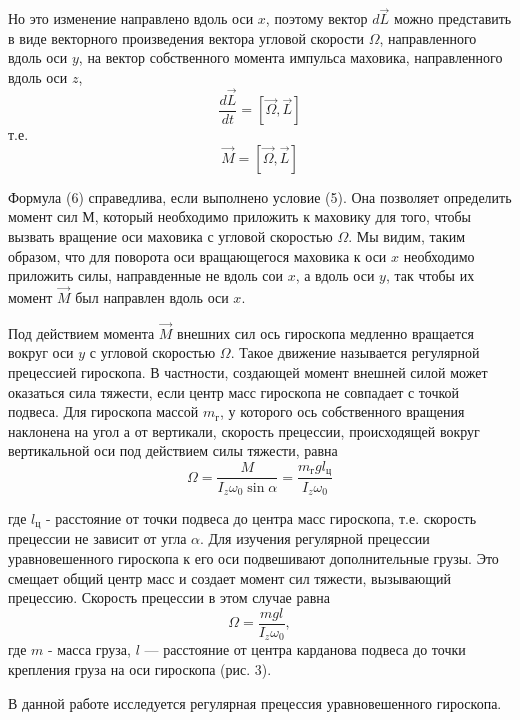Но это изменение направлено вдоль оси $x$, поэтому вектор $d\vec{L}$
можно представить в виде векторного произведения вектора угловой
скорости $\Omega$, направленного вдоль оси $y$, на вектор
собственного момента импульса маховика, направленного вдоль оси $z$,
\begin{equation*}
    \frac{d\vec{L}}{dt} = \left[\vec \Omega, \vec L\right]
\end{equation*}
т.е.
\begin{equation}
    \vec{M} = \left[\vec \Omega, \vec L\right]
\end{equation}

Формула (6) справедлива, если выполнено условие (5). Она позволяет
определить момент сил М, который необходимо приложить к маховику
для того, чтобы вызвать вращение оси маховика с угловой скоростью
$\Omega$. Мы видим, таким образом, что для поворота оси
вращающегося маховика к оси $x$ необходимо приложить силы, направденные
не вдоль сои $x$, а вдоль оси $y$, так чтобы их момент $\vec{M}$
был направлен вдоль оси $x$.


Под действием момента $\vec{M}$ внешних сил ось гироскопа медленно
вращается вокруг оси $y$ с угловой скоростью $\Omega$. Такое
движение называется регулярной прецессией гироскопа. В частности,
создающей момент внешней силой может оказаться сила тяжести, если
центр масс гироскопа не совпадает с точкой подвеса. Для гироскопа
массой $m_\text{г}$, у которого ось собственного вращения наклонена
на угол а от вертикали, скорость прецессии, происходящей вокруг
вертикальной оси под действием силы тяжести, равна
\begin{equation}
    \Omega = \frac{M}{I_z\omega_0\sin\alpha} = \frac{m_\text{г}gl_\text{ц}}{I_z\omega_0}
\end{equation}

где $l_\text{ц}$ - расстояние от точки подвеса до центра масс
гироскопа, т.е. скорость прецессии не зависит от угла $\alpha$. Для
изучения регулярной прецессии уравновешенного гироскопа к его оси
подвешивают дополнительные грузы. Это смещает общий центр масс и
создает момент сил тяжести, вызывающий прецессию. Скорость
прецессии в этом случае равна
\begin{equation}
    \Omega =\frac{mgl}{I_z\omega_0},
\end{equation}
где $m$ - масса груза, $l$ — расстояние от центра карданова
подвеса до точки крепления груза на оси гироскопа (рис. 3).

В данной работе исследуется регулярная прецессия уравновешенного
гироскопа.

